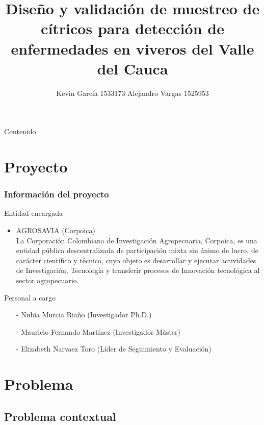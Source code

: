 \documentclass[10pt]{beamer}
\author[Kevin García - Alejandro Vargas]{Kevin García 1533173 \newline Alejandro Vargas 1525953}
\institute{Universidad del Valle}
\title{Diseño y validación de muestreo de cítricos para detección de enfermedades en viveros del Valle del Cauca}
\begin{document}
\begin{frame}[plain]
\maketitle
\end{frame}

\begin{frame}{Contenido}
\tableofcontents
\end{frame}

\section{Proyecto}
\begin{frame}
\frametitle{Información del proyecto}
\begin{block}{Entidad encargada}
\begin{itemize}
\justifying
\item AGROSAVIA (Corpoica)
~\\La Corporación Colombiana de Investigación Agropecuaria, Corpoica, es una entidad pública descentralizada de participación mixta sin ánimo de lucro, de carácter científico y técnico, cuyo objeto es desarrollar y ejecutar actividades de Investigación, Tecnología y transferir procesos de Innovación tecnológica al sector agropecuario.
\end{itemize}
\end{block}
\begin{block}{Personal a cargo}
\begin{itemize}
\item[-]Nubia Murcia Riaño (Investigador Ph.D.)
\item[-]Mauricio Fernando Martínez (Investigador Máster)
\item[-]Elizabeth Narvaez Toro (Líder de Seguimiento y Evaluación)
\end{itemize}
\end{block}
\end{frame}

\section{Problema}
\subsection{Problema contextual}
\end{document}

